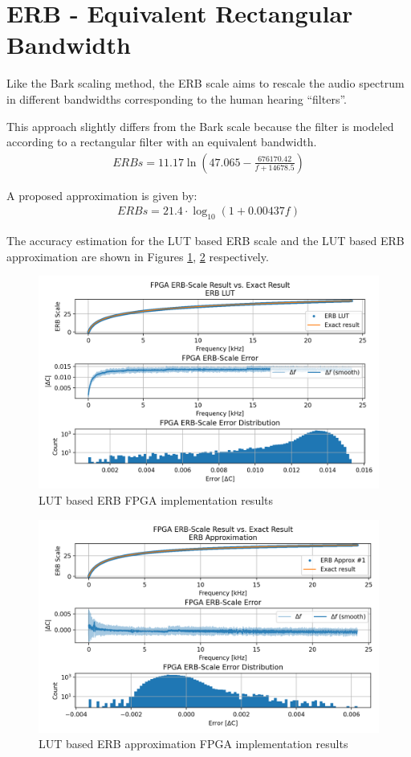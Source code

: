 \section{ERB - Equivalent Rectangular Bandwidth}
Like the Bark scaling method, the ERB scale aims 
to rescale the audio spectrum in different 
bandwidths corresponding to the human hearing ``filters''.

This approach slightly differs from the Bark scale
because the filter is modeled according
to a rectangular filter with an equivalent
bandwidth.
\begin{align}\label{eq:erb_eq}
    ERBs = 11.17\ln (47.065 - \frac{676170.42}{f + 14678.5})    
\end{align}

A proposed approximation is given by:
\begin{align}\label{eq:erb_approx_eq}
    ERBs = 21.4 \cdot \log_{10} (1 + 0.00437f)    
\end{align}


The accuracy estimation for the LUT based ERB scale
and the LUT based ERB approximation are shown in Figures 
\ref{fig:erb_fpga}, \ref{fig:erb_approx} respectively.

\begin{figure}[H]
    \centering
    \includegraphics[width=0.75\linewidth]{Scaling/images/erb}
    \caption{LUT based ERB FPGA implementation results}\label{fig:erb_fpga}
\end{figure}

\begin{figure}[H]
    \centering
    \includegraphics[width=0.75\linewidth]{Scaling/images/erb_approx}
    \caption{LUT based ERB approximation FPGA implementation results}\label{fig:erb_approx}
\end{figure}


